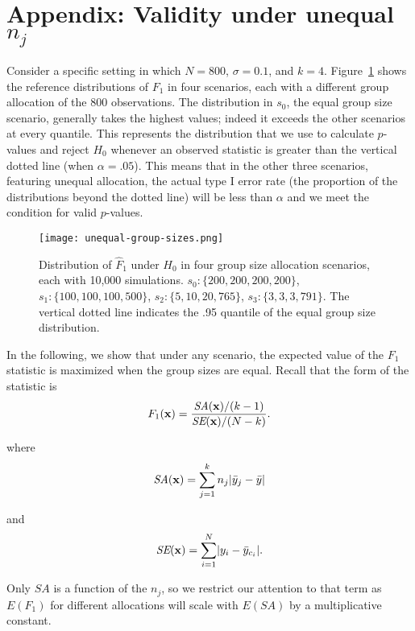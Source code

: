 
\section{Appendix: Validity under unequal $n_j$}\label{app:unequal}

Consider a specific setting in which $N = 800$, $\sigma = 0.1$, and $k = 4$. Figure~\ref{Fig:unequal-group-sizes} shows the reference distributions of $F_1$ in four scenarios, each with a different group allocation of the 800 observations. The distribution in $s_0$, the equal group size scenario, generally takes the highest values; indeed it exceeds the other scenarios at every quantile. This represents the distribution that we use to calculate $p$-values and reject $H_0$ whenever an observed statistic is greater than the vertical dotted line (when $\alpha = .05$). This means that in the other three scenarios, featuring unequal allocation, the actual type I error rate (the proportion of the distributions beyond the dotted line) will be less than $\alpha$ and we meet the condition for valid $p$-values.

\begin{figure}
\centering
\texttt{[image: unequal-group-sizes.png]}
\caption{Distribution of $\hat{F}_1$ under $H_0$ in four group size allocation scenarios, each with 10,000 simulations. $s_0\colon \{200, 200, 200, 200 \}$, $s_1\colon \{100, 100, 100, 500 \}$, $s_2\colon \{5, 10, 20, 765 \}$, $s_3\colon \{3, 3, 3, 791 \}$. The vertical dotted line indicates the .95 quantile of the equal group size distribution.\label{Fig:unequal-group-sizes}}
\end{figure}

In the following, we show that under any scenario, the expected value of the $F_1$ statistic is maximized when the group sizes are equal. Recall that the form of the statistic is
$$
F_1(\mathbf{x}) = \frac{\textit{SA}(\mathbf{x})/(k-1)}{\textit{SE}(\mathbf{x})/(N-k)}.
$$

where
\begin{equation*}
\textit{SA}(\mathbf{x}) = \sum_{j=1}^k n_j |\bar{y}_j - \bar y|
\end{equation*}

and
\begin{equation*}
\textit{SE}(\mathbf{x}) = \sum_{i=1}^N \lvert y_{i} - \bar{y}_{c_i} \rvert.
\end{equation*}

Only $SA$ is a function of the $n_j$, so we restrict our attention to that term as $E(F_1)$ for different allocations will scale with $E(SA)$ by a multiplicative constant.


